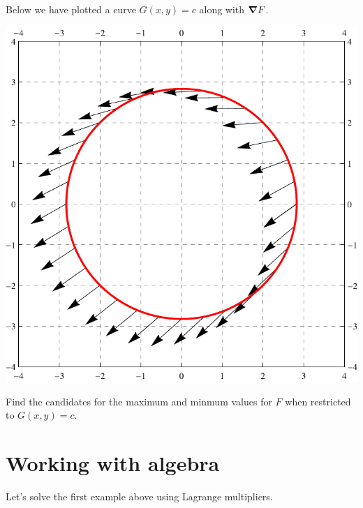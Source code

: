 \documentclass{ximera}
\begin{document}
\begin{example}
  Below we have plotted a curve $G(x,y) = c$ along with $\boldsymbol\nabla F$.
  \begin{image}
    \includegraphics{curveVectors2.pdf}
  \end{image}
  Find the candidates for the maximum and minmum values for $F$ when
  restricted to $G(x,y) = c$.
  \begin{explanation}
  \end{explanation}
\end{example}
\section{Working with algebra}

Let's solve the first example above using Lagrange multipliers.
\end{document}
